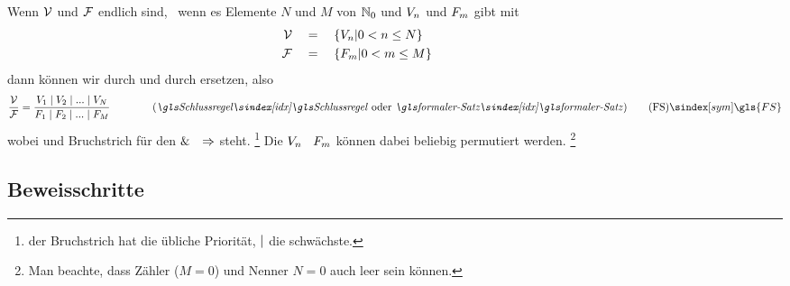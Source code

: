 Wenn $\Voraussetzungsmenge$ und $\Folgerungsmenge$ endlich sind, \textdh\ wenn es Elemente $N$ und $M$ von $\mathbb{N}_0$ und  $V_n$ und $F_m$ gibt mit
\begin{align}
	\mathcal{V} & \quad = \quad \{V_n | 0 < n \le N \}
	\label{def:Voraussetzungen} \\
	\mathcal{F}     & \quad = \quad \{F_m     | 0 < m \le M \}
	\label{def:Folgerungen} &&&&&&&&&&
\end{align}
dann können wir \seqqt{$\Voraussetzungsmenge$} durch  und \seqqt{$\Folgerungsmenge$} durch  ersetzen, also \textzB\
\[
	\frac{\Voraussetzungsmenge}{\Folgerungsmenge} =
	\frac
		{\Voraussetzung_1 \srand \Voraussetzung_2 \srand ...\srand \Voraussetzung_N}
		{\Folgerung_1     \srand \Folgerung_2     \srand ...\srand \Folgerung_M    }
	\qquad \qquad \text{(\emph{\glsIdx{Schlussregel}} oder \emph{\glsIdx{formaler-Satz}})}
	\tag{\tagFS} \sym{\gls{FS}} \label{def:formalerSatz}
\]
wobei \chrqt{$\srand$} und Bruchstrich für den  $\&$ \textbzw\ $\Rightarrow$ steht.%
\footnote{%
	der Bruchstrich hat die übliche Priorität, $\srand$ die schwächste.
}
Die $V_n$ \textbzw\ $F_m$ können dabei beliebig permutiert werden.%
\footnote{%
	Man beachte, dass Zähler ($M=0$) und Nenner $N=0$ auch leer sein können.
}

\subsection{Beweisschritte}%
\label{sub:Beweisschritte}

